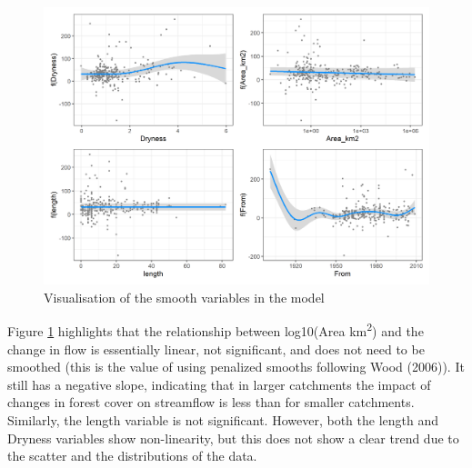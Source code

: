 \documentclass[]{elsarticle} %
\begin{document}
\begin{figure}
\includegraphics[width=0.9\linewidth]{model6_smooths} \caption{Visualisation of the smooth variables in the model}\label{fig:smoothsmodel6}
\end{figure}

Figure \ref{fig:smoothsmodel6} highlights that the relationship between log10(Area km\textsuperscript{2}) and the change in flow is essentially linear, not significant, and does not need to be smoothed (this is the value of using penalized smooths following Wood (2006)). It still has a negative slope, indicating that in larger catchments the impact of changes in forest cover on streamflow is less than for smaller catchments. Similarly, the length variable is not significant. However, both the length and Dryness variables show non-linearity, but this does not show a clear trend due to the scatter and the distributions of the data.
\end{document}
